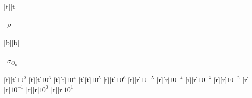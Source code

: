 %    
%
%
\begin{psfrags}%
\psfragscanon%
%
[t][t]{\color[rgb]{0,0,0}\setlength{\tabcolsep}{0pt}\begin{tabular}{c}{\Large$\rho$}\end{tabular}}%
[b][b]{\color[rgb]{0,0,0}\setlength{\tabcolsep}{0pt}\begin{tabular}{c}{\Large$\sigma_{\Theta_\mathrm{K}}$}\end{tabular}}%
%
[t][t]{$10^{2}$}%
[t][t]{$10^{3}$}%
[t][t]{$10^{4}$}%
[t][t]{$10^{5}$}%
[t][t]{$10^{6}$}%
%
[r][r]{$10^{-5}$}%
[r][r]{$10^{-4}$}%
[r][r]{$10^{-3}$}%
[r][r]{$10^{-2}$}%
[r][r]{$10^{-1}$}%
[r][r]{$10^{0}$}%
[r][r]{$10^{1}$}%
%
%
\end{psfrags}%
%
